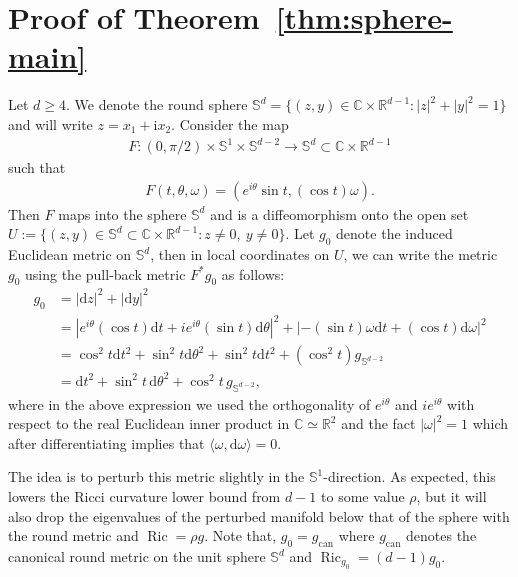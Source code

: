 \documentclass[11pt,reqno]{amsart}
\numberwithin{equation}{section}
\theoremstyle{definition}
\theoremstyle{remark}
\newcommand{\la}{\langle}
\newcommand{\ra}{\rangle}
\newcommand{\C}{\mathbb{C}}
\newcommand{\R}{\mathbb{R}}
\newcommand{\ud}{\mathrm{d}}
\newcommand{\0}{\emptyset}
\newcommand{\bbR}{\mathbb R}
\newcommand{\bbS}{\mathbb S}
\newcommand{\Ric}{\operatorname{Ric}}
\newcommand{\can}{\mathrm{can}}
\begin{document}
\section{Proof of Theorem~\ref{thm:sphere-main}}\label{sec:sphere-thm-main}
Let $d\geq 4$. We denote the round sphere $\bbS^d=\{(z,y)\in \mathbb C\times \mathbb R^{d-1}: |z|^2+|y|^2=1\}$ and will write \(z=x_1+\mathrm i x_2\). Consider the map
\begin{align}
    F:(0,\pi/2)\times \bbS^1\times \bbS^{d-2} \to \mathbb{S}^d \subset \mathbb{C}\times \bbR^{d-1}
\end{align}
such that 
\begin{align}
    F(t,\theta,\omega) = (e^{i\theta}\sin t, (\cos t) \omega).
\end{align}
Then $F$ maps into the sphere $\mathbb{S}^d$ and is a diffeomorphism onto the open set $U:= \{(z,y)\in\mathbb S^d\subset\mathbb C\times\mathbb R^{d-1}:z\neq0,\ y\neq0\}.$ Let $g_0$ denote the induced Euclidean metric on $\mathbb{S}^d$, then in local coordinates on $U$, we can write the metric $g_0$ using the pull-back metric $F^*g_0$ as follows:
\begin{align}\label{eqn:expression-for-g_can-Sn}
    g_0  &= |\ud z|^2 + |\ud y|^2\\
    &= |e^{i\theta} (\cos t)  \ud t+ ie^{i\theta} (\sin t)  \ud \theta|^2 + |-(\sin t) \omega \ud t + (\cos t) \ud \omega|^2\\
    &= \cos^2 t \ud t^2 + \sin^2 t \ud \theta^2 + \sin^2 t \ud t^2 + (\cos^2 t) g_{\mathbb{S}^{d-2}}\\
    &= \ud t^2+\sin^2t\,\ud \theta^2+\cos^2t\,g_{\mathbb S^{d-2}},
\end{align}
where in the above expression we used the orthogonality of $e^{i\theta}$ and $ie^{i\theta}$ with respect to the real Euclidean inner product in $\C\simeq \R^2$ and the fact $|\omega|^2=1$ which after differentiating implies that $\la \omega, \ud \omega\ra=0$.

The idea is to perturb this metric slightly in the \(\bbS^1\)-direction. As
expected, this lowers the Ricci curvature lower bound from \(d-1\) to some value $\rho$, but it will also drop the eigenvalues of the perturbed manifold below that of the sphere with the round metric and $\Ric=\rho g.$ Note that, $g_0=g_{\can}$ where $g_{\can}$ denotes the canonical round metric on the unit sphere $\bbS^d$ and $\Ric_{g_0}=(d-1)g_0.$
\end{document}
